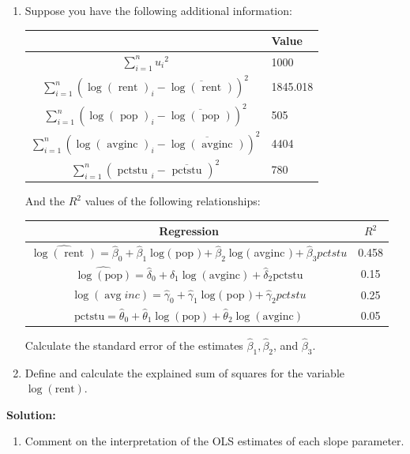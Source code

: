 \documentclass[12pt]{article}
\begin{document}
\begin{enumerate}
\begin{enumerate}
\item Suppose you have the following additional information:
\begin{center}
\begin{tabular}{|c|l|}
\hline & Value \\
\hline $\sum_{i=1}^n \hat{u}_i{ }^2$ & 1000 \\
\hline $\sum_{i=1}^n\left(\log (\text { rent })_i-\overline{\log (\text { rent })}\right)^2$ & 1845.018 \\
\hline $\sum_{i=1}^n\left(\log (\text { pop })_i-\overline{\log (\text { pop })}\right)^2$ & 505 \\
\hline $\sum_{i=1}^n\left(\log (\text { avginc })_i-\overline{\log (\text { avginc })}\right)^2$ & 4404 \\
\hline $\sum_{i=1}^n\left(\text { pctstu }_i-\overline{\text { pctstu }}\right)^2$ & 780 \\
\hline
\end{tabular}
\end{center}
And the \( R^2 \) values of the following relationships:
\begin{center}
\begin{tabular}{|c|c|}
\hline Regression & \( R^2 \) \\
\hline $\widehat{\log (\text { rent })}=\hat{\beta}_0+\hat{\beta}_1 \log ($ pop $)+\hat{\beta}_2 \log ($ avginc $)+\hat{\beta}_3 p c t s t u$ & 0.458 \\
\hline $\widehat{\log (\text{pop})} = \hat{\delta}_0 + \hat{\delta}_1 \log (\text{avginc}) + \hat{\delta}_2 \text{pctstu}$ & 0.15 \\
\hline $\log (\operatorname{avg} i n c)=\hat{\gamma}_0+\hat{\gamma}_1 \log ($ pop $)+\hat{\gamma}_2 p c t s t u$ & 0.25 \\
\hline $\text{pctstu} = \hat{\theta}_0 + \hat{\theta}_1 \log (\text{pop}) + \hat{\theta}_2 \log (\text{avginc})$ & 0.05\\
\hline
\end{tabular}
\end{center}

Calculate the standard error of the estimates \( \widehat{\beta}_1, \hat{\beta}_2 \), and \( \hat{\beta}_3 \).

\item Define and calculate the explained sum of squares for the variable \( \log(\text{rent}) \).


\end{enumerate}

{\color{blue}
\noindent \textbf{Solution:}
\begin{enumerate}
    \item Comment on the interpretation of the OLS estimates of each slope parameter.


\end{enumerate}}
\end{enumerate}
\end{document}
